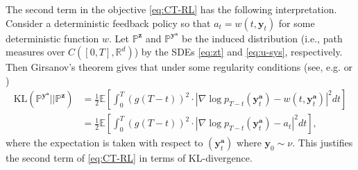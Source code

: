 \documentclass[11pt]{article}
\begin{document}
The second term in the objective \eqref{eq:CT-RL} has the following interpretation. Consider a deterministic feedback policy so that $a_t = w(t, \mathbf{y}_t)$ for some deterministic function $w$.
Let $\mathbb{P}^{\mathbf{z}}$ and $\mathbb{P}^{\mathbf{y}^{\mathbf{a}}}$ be the induced distribution (i.e., path measures over $C([0, T], \mathbb{R}^d)$) by the SDEs
\eqref{eq:zt} and \eqref{eq:u-sys}, respectively. Then Girsanov's theorem gives that under some regularity conditions (see, e.g.  \citealp[Appendix C]{uehara2024fine} or \citealp[Proposition 3.3]{tang2024fine})
\begin{align}\label{eq:KL}
 \text{KL} (\mathbb{P}^{\mathbf{y}^{\mathbf{a}}} || \mathbb{P}^{\mathbf{z}}) & = \frac{1}{2} \mathbb{E} \left[ \int_0^T (g(T-t))^{2} \cdot{| \nabla\log p_{T-t}({\mathbf{y}}^{\mathbf{a}}_{t}) - w(t, \mathbf{y}_t^{\mathbf{a}}) |^2} dt \right] \nonumber \\
& = \frac{1}{2} \mathbb{E} \left[ \int_0^T (g(T-t))^{2} \cdot{| \nabla\log p_{T-t}({\mathbf{y}}^{\mathbf{a}}_{t}) - a_t|^2} dt \right],
\end{align}
where the expectation is taken with respect to $(\mathbf{y}^{\mathbf{a}}_{t})$ where $\mathbf{y}_{0}\sim\nu.$ This justifies the second term of \eqref{eq:CT-RL} in terms of KL-divergence.
\end{document}
